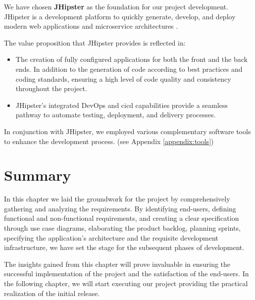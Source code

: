 We have chosen \textbf{JHipster} as the foundation for our project development. JHipster is a development
platform to quickly generate, develop, and deploy modern web applications and microservice
architectures \cite{jhipster}.

\noindent The value proposition that JHipster provides is reflected in:

\begin{itemize}
      \item The creation of fully configured applications for both the front and the back ends.
            In addition to the generation of code according to best practices and coding standards,
            ensuring a high level of code quality and consistency throughout the project.
      \item JHipster's integrated DevOps and \acrshort{cicd} capabilities provide a seamless pathway to automate
            testing, deployment, and delivery processes.
\end{itemize}

\noindent In conjunction with JHipster, we employed various complementary software tools to enhance
the development process. (see Appendix \ref{appendix:tools})

\section*{Summary}
In this chapter we laid the groundwork for the project by comprehensively gathering and analyzing
the requirements. By identifying end-users, defining functional and non-functional requirements,
and creating a clear specification through use case diagrams, elaborating the product backlog, planning
sprints, specifying the application's architecture and the requisite development infrastructure, we have
set the stage for the subsequent phases of development.

The insights gained from this chapter will prove invaluable in ensuring the successful implementation
of the project and the satisfaction of the end-users. In the following chapter, we will start executing
our project providing the practical realization of the initial release.
